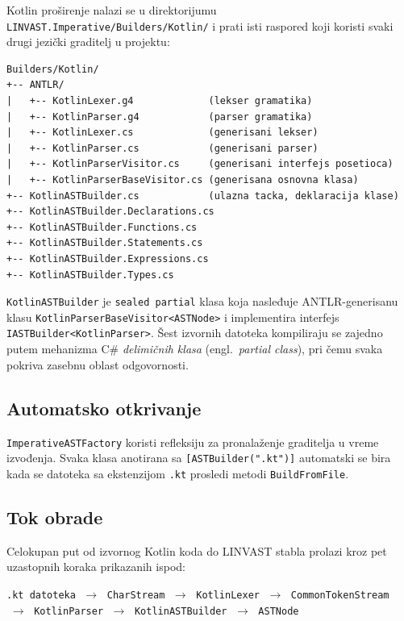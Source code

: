 \documentclass[a4paper]{article}
\begin{document}
Kotlin proširenje nalazi se u direktorijumu
\texttt{LINVAST.Imperative/Builders/Kotlin/} i prati isti raspored koji koristi
svaki drugi jezički graditelj u projektu:

\begin{verbatim}
Builders/Kotlin/
+-- ANTLR/
|   +-- KotlinLexer.g4             (lekser gramatika)
|   +-- KotlinParser.g4            (parser gramatika)
|   +-- KotlinLexer.cs             (generisani lekser)
|   +-- KotlinParser.cs            (generisani parser)
|   +-- KotlinParserVisitor.cs     (generisani interfejs posetioca)
|   +-- KotlinParserBaseVisitor.cs (generisana osnovna klasa)
+-- KotlinASTBuilder.cs            (ulazna tacka, deklaracija klase)
+-- KotlinASTBuilder.Declarations.cs
+-- KotlinASTBuilder.Functions.cs
+-- KotlinASTBuilder.Statements.cs
+-- KotlinASTBuilder.Expressions.cs
+-- KotlinASTBuilder.Types.cs
\end{verbatim}

\begin{sloppypar}
\texttt{KotlinASTBuilder} je \texttt{sealed partial} klasa koja nasleđuje
ANTLR-generisanu klasu \texttt{KotlinParserBaseVisitor<ASTNode>} i implementira
interfejs \texttt{IASTBuilder<KotlinParser>}. Šest izvornih datoteka kompiliraju
se zajedno putem mehanizma C\# \emph{delimičnih klasa} (engl.\ \emph{partial
class}), pri čemu svaka pokriva zasebnu oblast odgovornosti.
\end{sloppypar}

\newpage
\subsection{Automatsko otkrivanje}

\texttt{ImperativeASTFactory} koristi refleksiju za pronalaženje graditelja u
vreme izvođenja. Svaka klasa anotirana sa \texttt{[ASTBuilder(".kt")]}
automatski se bira kada se datoteka sa ekstenzijom \texttt{.kt} prosledi metodi
\texttt{BuildFromFile}.

\subsection{Tok obrade}

Celokupan put od izvornog Kotlin koda do LINVAST stabla prolazi kroz pet
uzastopnih koraka prikazanih ispod:

\begin{center}
\texttt{.kt datoteka}
$\;\to\;$ \texttt{CharStream}
$\;\to\;$ \texttt{KotlinLexer}
$\;\to\;$ \texttt{CommonTokenStream}
$\;\to\;$ \texttt{KotlinParser}
$\;\to\;$ \texttt{KotlinASTBuilder}
$\;\to\;$ \texttt{ASTNode}
\end{center}
\end{document}
